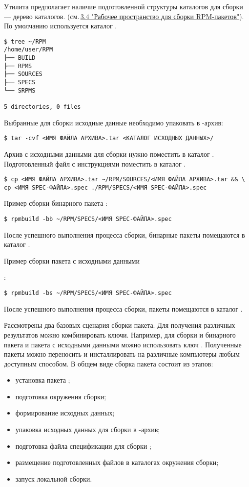Утилита предполагает наличие подготовленной структуры каталогов для сборки --- дерево каталогов.
(см.\,\hyperlink{3.4}{3.4 "Рабочее пространство для сборки RPM-пакетов"}). По умолчанию используется
каталог .

\begin{verbatim}
$ tree ~/RPM
/home/user/RPM
├── BUILD
├── RPMS
├── SOURCES
├── SPECS
└── SRPMS

5 directories, 0 files
\end{verbatim}

Выбранные для сборки исходные данные необходимо упаковать в -архив:

\begin{verbatim}
$ tar -cvf <ИМЯ ФАЙЛА АРХИВА>.tar <КАТАЛОГ ИСХОДНЫХ ДАННЫХ>/
\end{verbatim}

Архив с исходными данными для сборки нужно поместить в каталог .
Подготовленный  файл с инструкциями поместить в каталог .

\begin{verbatim}
$ cp <ИМЯ ФАЙЛА АРХИВА>.tar ~/RPM/SOURCES/<ИМЯ ФАЙЛА АРХИВА>.tar && \
cp <ИМЯ SPEC-ФАЙЛА>.spec ./RPM/SPECS/<ИМЯ SPEC-ФАЙЛА>.spec
\end{verbatim}

Пример сборки бинарного пакета :
\begin{verbatim}
$ rpmbuild -bb ~/RPM/SPECS/<ИМЯ SPEC-ФАЙЛА>.spec
\end{verbatim}
После успешного выполнения процесса сборки, бинарные пакеты  помещаются в каталог .

\hypertarget{rpmbuild-exampl-src}{Пример сборки пакета с исходными данными }:
\begin{verbatim}
$ rpmbuild -bs ~/RPM/SPECS/<ИМЯ SPEC-ФАЙЛА>.spec
\end{verbatim}
После успешного выполнения процесса сборки, пакеты  помещаются в каталог .

Рассмотрены два базовых сценария сборки пакета. Для получения различных результатов можно комбинировать ключи.
Например, для сборки и бинарного пакета и пакета с исходными данными можно использовать ключ \Sys{-ba}.
Полученные пакеты можно переносить и инсталлировать на различные компьютеры любым доступным способом.
В общем виде сборка пакета состоит из этапов:
\begin{itemize}
\item установка пакета ;
\item подготовка окружения сборки;
\item формирование исходных данных;
\item упаковка исходных данных для сборки в -архив;
\item подготовка файла спецификации для сборки ;
\item размещение подготовленных файлов в каталогах окружения сборки;
\item запуск локальной сборки.
\end{itemize}

